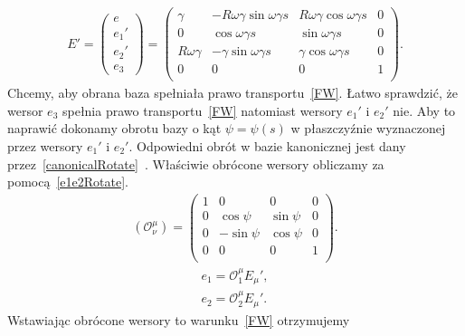 \begin{align}\label{Esimpleprim}
E'=
\begin{pmatrix}
e\\
e_1'\\
e_2'\\
e_3
\end{pmatrix}
=
\begin{pmatrix}
\gamma          & -R\omega\gamma\sin\omega\gamma s  
& R\omega\gamma\cos\omega\gamma s & 0 \\
0                   & \cos\omega\gamma s                   
&  \sin\omega\gamma s                & 0 \\
R\omega\gamma  & -\gamma\sin\omega\gamma    s           
& \gamma\cos\omega\gamma s           & 0 \\
0                   &   0                                           
& 0                                      & 1 \\
\end{pmatrix}.
\end{align}
Chcemy, aby obrana baza spełniała prawo transportu~\eqref{FW}. 
Łatwo sprawdzić, że wersor $e_3$ spełnia prawo 
transportu~\eqref{FW} natomiast wersory $e_1'$ i $e_2'$ nie.
Aby to naprawić
dokonamy obrotu bazy o kąt $\psi=\psi(s)$ w płaszczyźnie wyznaczonej 
przez wersory $e_1'$ i $e_2'$. Odpowiedni obrót w bazie kanonicznej jest
dany przez~\eqref{canonicalRotate}~\cite{star1993algebra}.
Właściwie obrócone wersory obliczamy za pomocą~\eqref{e1e2Rotate}.
\begin{align}\label{canonicalRotate}
( \mathcal{O}^\mu_\nu )
=
\begin{pmatrix}
1 & 0           & 0             & 0 \\
0 & \cos\psi    & \sin\psi  & 0 \\
0 & -\sin\psi   & \cos\psi  & 0 \\
0 & 0           &0          & 1 \\
\end{pmatrix}.
\end{align}
\begin{align}\label{e1e2Rotate}
e_1 =  \mathcal{O}^\mu_1 E_\mu ', \\
e_2 =  \mathcal{O}^\mu_2 E_\mu ' .\nonumber
\end{align}
Wstawiając obrócone wersory to warunku~\eqref{FW} otrzymujemy 
